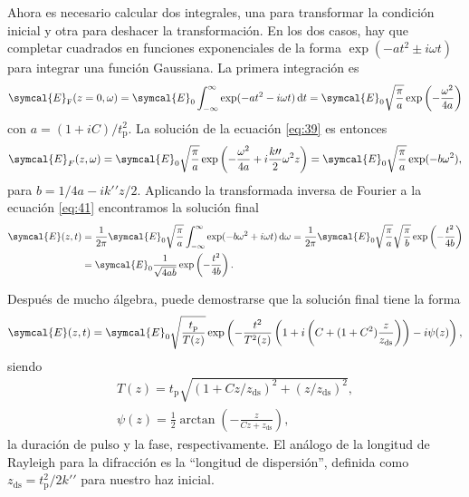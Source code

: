 \documentclass{scrartcl} %
\newcommand*{\diff}{\operatorname{d}\!}
\begin{document}
Ahora es necesario calcular dos integrales, una para transformar la condición inicial y otra para deshacer la transformación. En los dos casos, hay que completar cuadrados en funciones exponenciales de la forma $\exp(-at^{2} \pm i \omega t)$ para integrar una función Gaussiana. La primera integración es
\begin{equation}\label{eq:40}
  \symcal{E}_{\mathrm{F}}(z=0, \omega) = \symcal{E}_{0} \int_{-\infty}^{\infty} \exp(-at^{2} - i \omega t) \diff t = \symcal{E}_{0}\sqrt{\frac{\pi}{a}}\exp\left(-\frac{\omega^{2}}{4a}\right)
\end{equation}
con $a = (1+iC)/t^{2}_{\mathrm{p}}$. La solución de la ecuación \eqref{eq:39} es entonces
\begin{equation}\label{eq:41}
  \symcal{E}_{F}(z,\omega) = \symcal{E}_{0}\sqrt{\frac{\pi}{a}}\exp\left(-\frac{\omega^{2}}{4a} + i \frac{k \prime \prime}{2} \omega^{2} z\right) = \symcal{E}_{0}\sqrt{\frac{\pi}{a}}\exp(-b \omega^{2}),
\end{equation}
para $b = 1/4a - ik \prime \prime z/2$. Aplicando la transformada inversa de Fourier a la ecuación \eqref{eq:41} encontramos la solución final
\begin{equation}\label{eq:42}
  \begin{split}
    \symcal{E}(z,t) & = \frac{1}{2 \pi} \symcal{E}_{0}\sqrt{\frac{\pi}{a}}\int_{-\infty}^{\infty}\exp(-b \omega^{2} + i \omega t) \diff \omega = \frac{1}{2 \pi} \symcal{E}_{0}\sqrt{\frac{\pi}{a}}\sqrt{\frac{\pi}{b}}\exp \left(-\frac{t^{2}}{4b}\right) \\
    & = \symcal{E}_{0}\frac{1}{\sqrt{4ab}} \exp \left(-\frac{t^{2}}{4b}\right).
  \end{split}
\end{equation}

Después de mucho álgebra, puede demostrarse que la solución final tiene la forma
\begin{equation}\label{eq:43}
  \symcal{E}(z,t) = \symcal{E}_{0}\sqrt{\frac{t_{\mathrm{p}}}{T(z)}}\exp \left(-\frac{t^{2}}{T^{2}(z)}\left(1+i\left(C+(1+C^{2})\frac{z}{z_{\mathrm{ds}}}\right)\right) - i \psi(z)\right),
\end{equation}
siendo
\begin{align}
  T(z) = t_{\mathrm{p}}\sqrt{(1+Cz/z_{\mathrm{ds}})^{2} + (z/z_{\mathrm{ds}})^{2}}, \label{eq:44} \\
  \psi(z) = \frac{1}{2}\arctan \left(-\frac{z}{Cz + z_{\mathrm{ds}}}\right), \label{eq:45}
\end{align}
la duración de pulso y la fase, respectivamente. El análogo de la longitud de Rayleigh para la difracción es la \enquote{longitud de dispersión}, definida como $z_{\mathrm{ds}} = t^{2}_{\mathrm{p}}/2k \prime \prime$ para nuestro haz inicial. 
\end{document}
